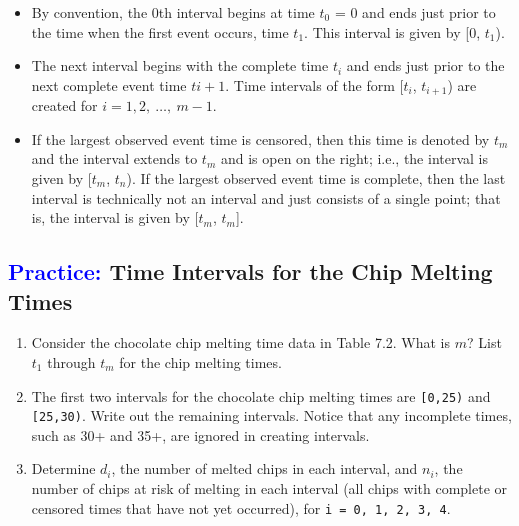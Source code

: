 \documentclass[
]{report}
\providecommand{\tightlist}{%
  \setlength{\itemsep}{0pt}\setlength{\parskip}{0pt}}
\begin{document}
\begin{itemize}
\tightlist
\item
  By convention, the 0th interval begins at time \(\scriptstyle t_0\) = 0 and ends just prior to the time when the first event occurs, time \(\scriptstyle t_1\). This interval is given by {[}0, \(\scriptstyle t_1\)).
\item
  The next interval begins with the complete time \(\scriptstyle t_i\) and ends just prior to the next complete event time \(\scriptstyle t{i+1}\). Time intervals of the form {[}\(\scriptstyle t_i\), \(\scriptstyle t_{i+1}\)) are created for \(\scriptstyle i = 1,  2,\ \dots,\ m-1\).
\item
  If the largest observed event time is censored, then this time is denoted by \(\scriptstyle t_m\) and the interval extends to \(\scriptstyle t_m\) and is open on the right; i.e., the interval is given by {[}\(\scriptstyle t_m\), \(\scriptstyle t_n\)). If the largest observed event time is complete, then the last interval is technically not an interval and just consists of a single point; that is, the interval is given by {[}\(\scriptstyle t_m\), \(\scriptstyle t_m\){]}.
\end{itemize}

\hypertarget{time-intervals-for-the-chip-melting-times}{%
\subsection*{\texorpdfstring{\textcolor{blue}{Practice:} Time Intervals for the Chip Melting Times}{ Time Intervals for the Chip Melting Times}}\label{time-intervals-for-the-chip-melting-times}}

\begin{enumerate}
\def\labelenumi{\arabic{enumi}.}
\setcounter{enumi}{5}
\item
  Consider the chocolate chip melting time data in Table 7.2. What is \(\scriptstyle m\)? List \(\scriptstyle t_1\) through \(\scriptstyle t_m\) for the chip melting times.
\item
  The first two intervals for the chocolate chip melting times are \texttt{{[}0,25)} and \texttt{{[}25,30)}. Write out the remaining intervals. Notice that any incomplete times, such as 30+ and 35+, are ignored in creating intervals.
\item
  Determine \(\scriptstyle d_i\), the number of melted chips in each interval, and \(\scriptstyle n_i\), the number of chips at risk of melting in each interval (all chips with complete or censored times that have not yet occurred), for \texttt{i\ =\ 0,\ 1,\ 2,\ 3,\ 4}.
\end{enumerate}
\end{document}
